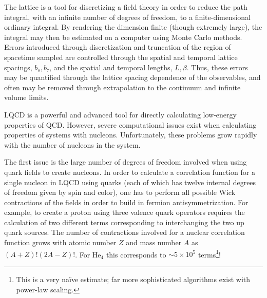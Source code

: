 The lattice is a tool for discretizing a field theory in order to reduce the path integral, with an infinite number of degrees of freedom, to a finite-dimensional ordinary integral. By rendering the dimension finite (though extremely large), the integral may then be estimated on a computer using Monte Carlo methods. Errors introduced through discretization and truncation of the region of spacetime sampled are controlled through the spatial and temporal lattice spacings, $b_s,b_{\tau}$, and the spatial and temporal lengths, $L,\beta$. Thus, these errors may be quantified through the lattice spacing dependence of the observables, and often may be removed through extrapolation to the continuum and infinite volume limits.

LQCD is a powerful and advanced tool for directly calculating low-energy properties of QCD. However, severe computational issues exist when calculating properties of systems with nucleons. Unfortunately, these problems grow rapidly with the number of nucleons in the system. 

The first issue is the large number of degrees of freedom involved when using quark fields to create nucleons. In order to calculate a correlation function for a single nucleon in LQCD using quarks (each of which has twelve internal degrees of freedom given by spin and color), one has to perform all possible Wick contractions of the fields in order to build in fermion antisymmetrization. For example, to create a proton using three valence quark operators requires the calculation of two different terms corresponding to interchanging the two up quark sources. The number of contractions involved for a nuclear correlation function grows with atomic number $Z$ and mass number $A$ as $(A+Z)!(2A-Z)!$. For He$_4$ this corresponds to $\sim 5 \times 10^5$ terms\footnote{This is a very na\"ive estimate; far more sophisticated algorithms exist with power-law scaling.}!

